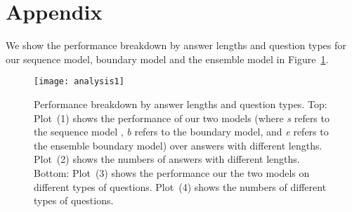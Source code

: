 \documentclass{article} \usepackage{iclr2017_conference,times}
\begin{document}



\newpage
\appendix
\section{Appendix}
We show the performance breakdown by answer lengths and question types for our sequence model, boundary model and the ensemble model in Figure~\ref{fig:ques}.
\begin{figure}[]
	\centering
	\texttt{[image: analysis1]}
	\caption{Performance breakdown by answer lengths and question types.  Top: Plot~(1) shows the performance of our two models (where \emph{s} refers to the sequence model , \emph{b} refers to the boundary model, and \emph{e} refers to the ensemble boundary model) over answers with different lengths. Plot~(2) shows the numbers of answers with different lengths. Bottom: Plot~(3) shows the performance our the two models on different types of questions. Plot~(4) shows the numbers of different types of questions.
}
	\label{fig:ques}
\end{figure} 
\end{document}
